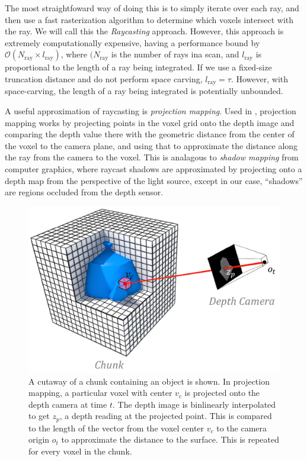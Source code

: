 The most straightfoward way of doing this is to simply iterate over each ray,
and then use a fast rasterization algorithm \cite{RayTracing} to determine which
voxels intersect with the ray. We will call this the \textit{Raycasting}
approach. However, this approach is extremely computationally expensive, having
a performance bound by $\mathcal{O}(N_{\text{ray}} \times
l_{\text{ray}})$, where $(N_{\text{ray}}$ is the number of rays ina 
scan, and $l_{\text{ray}}$  is  proportional to the length of a ray
being integrated. If we use a fixed-size truncation distance and do not perform 
space carving, $l_{\text{ray}} = \tau$. However, with space-carving,
the length of a ray being integrated is potentially unbounded.

A useful approximation of raycasting is \textit{projection mapping}. Used in
\cite{Nguyen2012, Bylow2013, Klingensmith2014}, projection mapping works by
projecting points in the voxel grid onto the depth image and comparing the depth value
there with the geometric distance from the center of the voxel to the camera
plane, and using that to approximate the distance along the ray from the camera
to the voxel. This is analagous to \textit{shadow mapping} \cite{Shadowmapping}
from computer graphics, where raycast shadows are approximated by projecting
onto a depth map from the perspective of the light source, except in our case, 
``shadows'' are regions occluded from the depth sensor.  

\begin{figure}
  \centering
    \includegraphics[width=0.95\columnwidth]{img/projection_mapping}
      \caption{A cutaway of a chunk containing an object is shown. In projection
      mapping,  a particular voxel with center $v_c$ is projected onto the depth
      camera at time $t$. The depth image is binlinearly interpolated to get
      $z_p$, a depth reading at the projected point. This is compared to the length of the vector
      from the voxel center $v_c$ to the camera origin $o_t$ to approximate the
      distance to the surface. This is repeated for every voxel in the chunk.}
  \label{fig:projection_mapping} 
\end{figure} 


